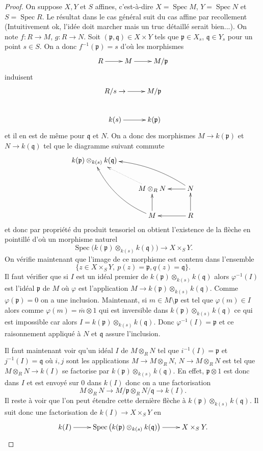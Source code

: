 \documentclass[A4, 11pt]{article}
\def\Spec{ \operatorname{Spec}}
\begin{document}
 \begin{proof}
 On suppose $X,Y$ et $S$ affines, c'est-à-dire $X=\Spec M$, $Y=\Spec N$ et $S=\Spec R$. Le résultat dans le cas général suit du cas affine par recollement (Intuitivement ok, l'idée doit marcher mais un truc détaillé serait bien...).
On note $f\colon R\rightarrow M$, $g\colon R\rightarrow N$.
 Soit $(\mathfrak{p}, \mathfrak{q})\in X\times Y$ tels que $\mathfrak{p}\in X_s$, $\mathfrak{q}\in Y_s$ pour un point $s\in S$. On a donc $f^{-1}(\mathfrak{p})=s$ d'où les morphismes 
 $$\xymatrix{
R \ar[r]& M \ar[r] & M/\mathfrak{p} \\
 }$$ 
 induisent
  $$\xymatrix{
R/s \ar[r]\rightarrow & M/\mathfrak{p} \\
k(s) \ar[r] & k(\mathfrak{p})
 }$$ 
 et il en est de même pour $\mathfrak{q}$ et $N$. On a donc des morphismes $M\rightarrow k(\mathfrak{p})$ et $N\rightarrow k(\mathfrak{q})$ tel que le diagramme suivant commute
 $$\xymatrix{
k(\mathfrak{p}) \otimes_{k(s)} k(\mathfrak{q}) & & \\
 & M \otimes_R N \ar@{.>}[ul] & N \ar[l] \ar@/_1pc/[llu] \\
 &  M \ar[u] \ar@/^1pc/[luu] & R \ar[l] \ar[u]  
 }$$
 et donc par propriété du produit tensoriel on obtient l'existence de la flèche en pointillé d'où un morphisme naturel
 $$\Spec \big( k(\mathfrak{p}) \otimes_{k(s)} k(\mathfrak{q}) \big) \rightarrow X\times_S Y.$$
 On vérifie maintenant que l'image de ce morphisme est contenu dans l'ensemble 
 $$\{z\in X\times_S Y, ~p(z)=\mathfrak{p}, q(z)=\mathfrak{q}\}.$$
 Il faut vérifier que si $I$ est un idéal premier de $k(\mathfrak{p}) \otimes_{k(s)} k(\mathfrak{q})$ alors $\varphi^{-1}(I)$ est l'idéal $\mathfrak{p}$ de $M$ où $\varphi$ est l'application $M\rightarrow k(\mathfrak{p}) \otimes_{k(s)} k(\mathfrak{q})$. Comme $\varphi(\mathfrak{p})=0$ on a une inclusion. Maintenant, si $m\in M\setminus \mathfrak{p}$ est tel que $\varphi(m)\in I$ alors comme $\varphi(m)=\overline{m}\otimes 1$ qui est inversible dans $k(\mathfrak{p}) \otimes_{k(s)} k(\mathfrak{q})$ ce qui est impossible car alors $I=k(\mathfrak{p}) \otimes_{k(s)} k(\mathfrak{q})$. Donc $\varphi^{-1}(I)=\mathfrak{p}$ et ce raisonnement appliqué à $N$ et $\mathfrak{q}$ assure l'inclusion. 
 
 Il faut maintenant voir qu'un idéal $I$ de $M\otimes_R N$ tel que $i^{-1}(I)=\mathfrak{p}$ et $j^{-1}(I)=\mathfrak{q}$ où $i,j$ sont les applications $M\rightarrow M\otimes_R N$, $N\rightarrow M\otimes_R N$ est tel que $M\otimes_R N \rightarrow k(I)$ se factorise par $k(\mathfrak{p}) \otimes_{k(s)} k(\mathfrak{q})$. En effet, $\mathfrak{p}\otimes 1$ est donc dans $I$ et est envoyé sur $0$ dans $k(I)$ donc on a une factorisation
 $$M\otimes_R N\rightarrow M/\mathfrak{p} \otimes_R N/ \mathfrak{q} \rightarrow k(I).$$
 Il reste à voir que l'on peut étendre cette dernière flèche à $k(\mathfrak{p}) \otimes_{k(s)} k(\mathfrak{q})$. Il suit donc une factorisation de $k(I)\rightarrow X\times_S Y$ en
 $$ \xymatrix{
 k(I)\ar[r] & \Spec \big(k(\mathfrak{p}) \otimes_{k(s)} k(\mathfrak{q})\big)\ar[r] & X\times_S Y. 
 }$$
 \end{proof}
 
\end{document}
